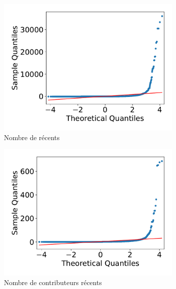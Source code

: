 \begin{figure}[ht]
    \begin{subfigure}[t]{0.3\textwidth}
        \includegraphics[width=\textwidth]{experiment/data_analysis/recentCommitCount_qqplot}
        \caption{Nombre de  récents}
    \end{subfigure}
    \begin{subfigure}[t]{0.3\textwidth}
        \includegraphics[width=\textwidth]{experiment/data_analysis/recentContributorCount_qqplot}
        \caption{Nombre de contributeurs récents}
    \end{subfigure}%
    \begin{subfigure}[t]{0.3\textwidth}

\end{subfigure}
\end{figure}

